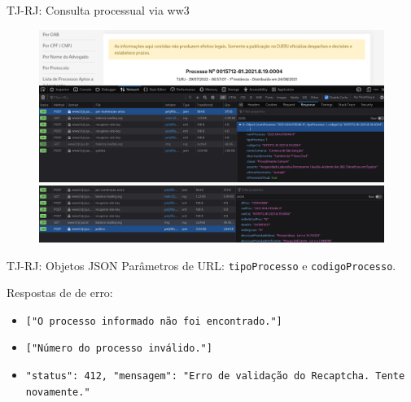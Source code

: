 \begin{frame}{TJ-RJ: Consulta processual via ww3}
    \begin{figure}
        \includegraphics[keepaspectratio,width=1\textheight]{img/tj-rj-ww3-resposta-unica}
        \includegraphics[keepaspectratio,width=1\textheight]{img/tj-rj-ww3-resposta-antiga}
    \end{figure}
\end{frame}

\begin{frame}{TJ-RJ: Objetos JSON}
    Parâmetros de URL: \texttt{tipoProcesso} e \texttt{codigoProcesso}.

    \vspace{1ex}

    Respostas de de erro:
    \begin{itemize}
        \tiny
        \item \texttt{["O processo informado não foi encontrado."]}
        \item \texttt{["Número do processo inválido."]}
        \item \texttt{{"status": 412, "mensagem": "Erro de validação do Recaptcha. Tente novamente."}}
    \end{itemize}
\end{frame}

